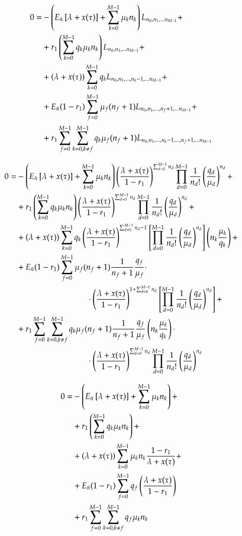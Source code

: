 \begin{equation}\begin{aligned}
    0 = 
    &-\left( {E_{\bar{n}}\left[ {\lambda + x(\tau)} \right] + \sum_{{k}=0}^{M-1}\mu_{k}{n}_{k}} \right)
        {L}_{{n}_0, {n}_1, ... {n}_{M-1}} + \\
    &+r_1 \left( {\sum_{{k}=0}^{M-1} q_{k}\mu_{k}{n}_{k}} \right) {L}_{{n}_0, {n}_1, ... {n}_{M-1}} + \\
    &+\left( {\lambda + x(\tau)} \right)\sum_{k=0}^{M-1}q_k {L}_{{n}_0, {n}_1, ... , {n}_{k} - 1, ... {n}_{M-1}}  + \\
    &+E_{\bar{n}}(1-r_1)\sum_{f=0}^{M-1} \mu_f (n_f + 1) {L}_{{n}_0, {n}_1, ... , {n}_{f} + 1, ... {n}_{M-1}} + \\
    &+r_1 \sum_{{f}=0}^{M-1} \sum_{{k}=0, {k} \neq {f}}^{M-1} 
        q_k \mu_f (n_f+1) {L}_{{n}_0, {n}_1, ... , {n}_{k} - 1, ... , {n}_{f} + 1, ... {n}_{M-1}} 
\end{aligned}\end{equation}

\begin{equation}\begin{aligned}
    0 = 
    &-\Q{\En\T{\lxt} + \allExecutionFullIntensity{n}{k}} \Ldefinition{n}{d} +  \\
    &+r_1 \Q{\allExecutionRelativeIntensity{n}{k}}  \Ldefinition{n}{d} +  \\
    &+\Q{\lxt}\sum_{k=0}^{M-1}  q_k \LminusDefinition{n}{d}{k} + \\
    &+\En(1-r_1)\sum_{f=0}^{M-1} 
        \mu_f (n_f+1) \frac{1}{n_f + 1}
        \executionAbsoluteReverseIntensity{f} \cdot  \\
        & \hspace{3cm} \cdot \Q{\LunityBase}^{1 + \sum_{d=0}^{M-1}n_d} 
        \T{\LuniqueStandart{n}{d}} + \\
    &+r_1 \feedbackSum{f}{k} 
        q_k \mu_f (n_f+1) \frac{1}{n_f + 1} 
        \executionAbsoluteReverseIntensity{f}
        \Q{n_k\executionAbsoluteIntensity{k}} \cdot  \\
        & \hspace{3cm} \cdot \Ldefinition{n}{d}   
\end{aligned}\end{equation}

\begin{equation}\begin{aligned}
    0 = 
    &-\left( {E_{\bar{n}}\left[ {\lambda + x(\tau)} \right] + \sum_{{k}=0}^{M-1}\mu_{k}{n}_{k}} \right)  + \\
    &+r_1 \left( {\sum_{{k}=0}^{M-1} q_{k}\mu_{k}{n}_{k}} \right) + \\
    &+\left( {\lambda + x(\tau)} \right)\sum_{k=0}^{M-1}\mu_k n_k \frac{1-r_1}{\lambda + x(\tau)} + \\
    &+E_{\bar{n}}(1-r_1)\sum_{f=0}^{M-1} q_f \left( {\frac{\lambda + x(\tau)}{1-r_1}} \right) \\
    &+r_1 \sum_{{f}=0}^{M-1} \sum_{{k}=0, {k} \neq {f}}^{M-1} q_f \mu_k n_k 
\end{aligned}\end{equation}

